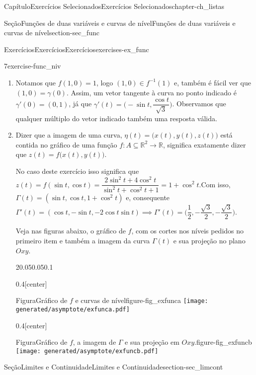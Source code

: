 \documentclass[oneside,10pt,]{book}
\numberwithin{equation}{section}
\newcommand{\R}{\mathbb R}
\begin{document}
\begin{chapterptx}{Capítulo}{Exercícios Selecionados}{}{Exercícios Selecionados}{}{}{chapter-ch_listas}
\begin{sectionptx}{Seção}{Funções de duas variáveis e curvas de nível}{}{Funções de duas variáveis e curvas de nível}{}{}{section-sec_func}
\begin{exercises-subsection-numberless}{Exercícios}{Exercícios}{}{Exercícios}{}{}{exercises-ex_func}
\begin{divisionexercise}{7}{}{}{exercise-func_niv}
\begin{enumerate}[label=\alph*.]
\item{}Notamos que \(f(1,0)=1\), logo \((1,0)\in
f^{-1}(1)\) e, também é fácil ver que \((1,0)=\gamma(0)\). Assim, um vetor tangente à curva no ponto indicado é \(\gamma'(0)=(0,1)\), já que \(\gamma'(t)=\big(-\sin t,\dfrac{\cos
t}{\sqrt{3}}\big)\). Observamos que qualquer múltiplo do vetor indicado também uma resposta válida.%
\item{}Dizer que a imagem de uma curva, \(\eta(t)=\big(x(t),
y(t), z(t)\big)\) está contida no gráfico de uma função \(f\colon A\subseteq\R^2\to\R\), significa exatamente dizer que \(z(t)=f\big(x(t),y(t)\big)\).%
\par
No caso deste exercício isso significa que \(z(t)=f(\sin t, \cos
t)=\dfrac{2\sin^2t+4\cos^2t}{\sin^2t+\cos^2t+1}=1+\cos^2t\).Com isso, \(\Gamma(t)=(\sin t,\cos t, 1+\cos^2t)\) e, consequente \(\Gamma'(t)=(\cos t, -\sin t, -2\cos
t\sin t)\implies
\Gamma'(t)=\big(\dfrac{1}{2},-\dfrac{\sqrt{3}}{2},-\dfrac{\sqrt{3}}{2}\big).\)%
\par
Veja nas figuras abaixo, o gráfico de \(f\), com os cortes nos níveis pedidos no primeiro item e também a imagem da curva \(\Gamma(t)\) e sua projeção no plano \(Oxy\). \begin{sidebyside}{2}{0.05}{0.05}{0.1}%
\begin{sbspanel}{0.4}[center]%
\begin{panelfigureptx}{Figura}{Gráfico de \(f\) e curvas de nível}{figure-fig_exfunca}{}%
\texttt{[image: generated/asymptote/exfunca.pdf]}
\tcblower
\end{panelfigureptx}%
\end{sbspanel}%
\begin{sbspanel}{0.4}[center]%
\begin{panelfigureptx}{Figura}{Gráfico de \(f\), a imagem de \(\Gamma\) e sua projeção em \(Oxy\).}{figure-fig_exfuncb}{}%
\texttt{[image: generated/asymptote/exfuncb.pdf]}
\tcblower
\end{panelfigureptx}%
\end{sbspanel}%
\end{sidebyside}%
%
\end{enumerate}
%
\end{divisionexercise}%
\end{exercises-subsection-numberless}
\end{sectionptx}
%
%
\typeout{************************************************}
\typeout{************************************************}
%
\begin{sectionptx}{Seção}{Limites e Continuidade}{}{Limites e Continuidade}{}{}{section-sec_limcont}

\end{sectionptx}
\end{chapterptx}
\end{document}
